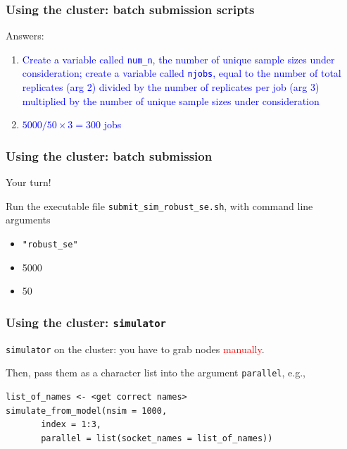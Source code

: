 \documentclass[12pt, 
hyperref={colorlinks=true, linkcolor=BlueViolet, urlcolor=BlueViolet},dvipsnames]{beamer}
\begin{document}
\begin{frame}
\frametitle{Using the cluster: batch submission scripts}

Answers: \vspace{-0.3cm}
\begin{enumerate}
\item \textcolor{blue}{Create a variable called \texttt{num\_n}, the number of unique sample sizes under consideration; create a variable called \texttt{njobs}, equal to the number of total replicates (arg 2) divided by the number of replicates per job (arg 3) multiplied by the number of unique sample sizes under consideration}
\item \textcolor{blue}{$5000/50\times 3 = 300$ jobs}
\end{enumerate}

\end{frame}

\begin{frame}
\frametitle{Using the cluster: batch submission}

Your turn! 

Run the executable file \texttt{submit\_sim\_robust\_se.sh}, with command line arguments \vspace{-0.3cm}
\begin{itemize}
\item \texttt{"robust\_se"}
\item 5000
\item 50
\end{itemize}
\end{frame}

\begin{frame}[fragile]
\frametitle{Using the cluster: \texttt{simulator}}
\texttt{simulator} on the cluster: you have to grab nodes \textcolor{red}{manually}. \pause

Then, pass them as a character list into the argument \texttt{parallel}, e.g., \pause
\begin{verbatim}
list_of_names <- <get correct names>
simulate_from_model(nsim = 1000, 
       index = 1:3, 
       parallel = list(socket_names = list_of_names))
\end{verbatim} 

\end{frame}
\end{document}
